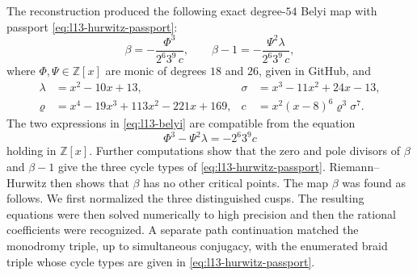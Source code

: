 \documentclass[10pt]{amsart}
\numberwithin{equation}{section}
\theoremstyle{definition}
\theoremstyle{remark}
\newcommand{\Z}{\mathbb{Z}}
\begin{document}
The reconstruction produced the following exact degree-$54$ Belyi map with
passport \eqref{eq:l13-hurwitz-passport}:
\begin{equation}\label{eq:l13-belyi}
 \beta=-\frac{\Phi^3}{2^6 3^9\,c},
 \qquad
 \beta-1=-\frac{\Psi^2\lambda}{2^6 3^9\,c},
\end{equation}
where $\Phi,\Psi\in\Z[x]$ are monic of degrees $18$ and $26$, given in GitHub, and
\[
\begin{aligned}
 \lambda&=x^2-10x+13, &
 \sigma&=x^3-11x^2+24x-13,\\
 \varrho&=x^4-19x^3+113x^2-221x+169, &
 c&=x^2(x-8)^6\varrho^3\sigma^7 .
\end{aligned}
\]
The two expressions in \eqref{eq:l13-belyi} are compatible from the equation
\begin{equation}\label{eq:l13-belyi-identity}
 \Phi^3-\Psi^2\lambda=-2^6 3^9 c
\end{equation}
holding in $\Z[x]$. Further computations show that the zero and pole divisors of $\beta$ and $\beta -1$ give the three cycle types of \eqref{eq:l13-hurwitz-passport}. Riemann--Hurwitz then
shows that $\beta$ has no other critical points.  The map $\beta$ was found as follows. We first
normalized the three distinguished cusps. The resulting equations were then solved
numerically to high precision and then the rational coefficients were recognized.  A separate path continuation matched the monodromy triple, up to
simultaneous conjugacy, with the enumerated braid triple whose cycle types are given in \eqref{eq:l13-hurwitz-passport}. 
\end{document}
